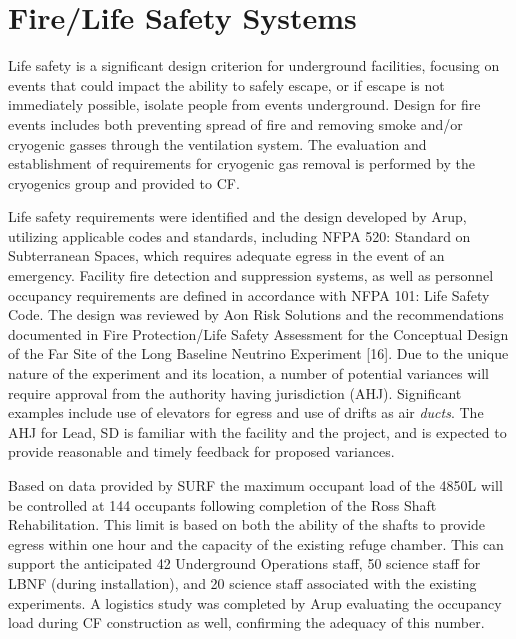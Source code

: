 \section{Fire/Life Safety Systems }
\label{sec:fscf-und-fire}

Life safety is a significant design criterion for underground facilities, focusing on events that could impact the ability to safely escape, or if escape is not immediately possible, isolate people from events underground. Design for fire events includes both preventing spread of fire and removing smoke and/or cryogenic gasses through the ventilation system. The evaluation and establishment of requirements for cryogenic gas removal is performed by the cryogenics group and provided to CF.

Life safety requirements were identified and the design developed by Arup, utilizing applicable codes and standards, including NFPA 520: Standard on Subterranean Spaces, which requires adequate egress in the event of an emergency. Facility fire detection and suppression systems, as well as personnel occupancy requirements are defined in accordance with NFPA 101: Life Safety Code. The design was reviewed by Aon Risk Solutions and the recommendations documented in Fire Protection/Life Safety Assessment for the Conceptual Design of the Far Site of the Long Baseline Neutrino Experiment [16]. Due to the unique nature of the experiment and its location, a number of potential variances will require approval from the authority having jurisdiction (AHJ). Significant examples include use of elevators for egress and use of drifts as air \textit{ducts}. The AHJ for Lead, SD is familiar with the facility and the project, and is expected to provide reasonable and timely feedback for proposed variances.  

Based on data provided by SURF the maximum occupant load of the 4850L will be controlled at 144 occupants following completion of the Ross Shaft Rehabilitation. This limit is based on both the ability of the shafts to provide egress within one hour and the capacity of the existing refuge chamber.  This can support the anticipated 42 Underground Operations staff, 50 science staff for LBNF (during installation), and 20 science staff associated with the existing experiments. A logistics study\cite{lbnf-logistics} was completed by Arup evaluating the occupancy load during CF construction as well, confirming the adequacy of this number.

